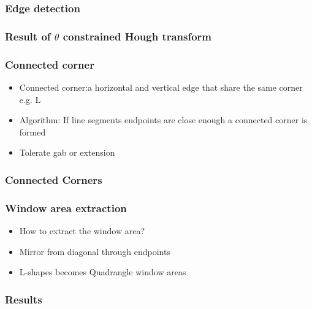 \documentclass{beamer}
\begin{document}
\frame
{
	\frametitle{Edge detection}
}

\frame
{
	\frametitle{Result of $\theta$ constrained Hough transform}
}

\frame
{
	\frametitle{Connected corner}
	\begin{itemize}
	\item <+-| alert@+> Connected corner:a horizontal and vertical edge that share the same
	corner e.g. L
	\item <+-| alert@+> Algorithm: If line segments endpoints are close enough a connected corner is formed
	\item <+-| alert@+> Tolerate gab or extension
	\end{itemize}
}

\frame
{
}

\frame
{
	\frametitle{Connected Corners}

}

\frame
{
	\frametitle{Window area extraction}
	\begin{itemize}
	\item <+-| alert@+> How to extract the window area?
	\item <+-| alert@+> Mirror from diagonal through endpoints
	\item <+-| alert@+> L-shapes becomes Quadrangle window areas
	\end{itemize}
}

\frame
{
	\frametitle{Results}
}
\end{document}

